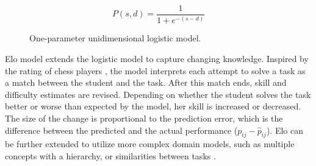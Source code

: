 \begin{figure}[htb]
\centering
\begin{subfigure}{.58\textwidth}
\centering
{}
\end{subfigure}
\begin{subfigure}{.38\textwidth}
\centering
\begin{equation}\label{eq:logistic}
P(s, d) = \frac{1}{1 + e^{-(s - d)}}
\end{equation}
\end{subfigure}
\caption{One-parameter unidimensional logistic model.}
\label{fig:logistic-model}
\end{figure}


Elo model \cite{alg.elo, mathsgarden} extends the logistic model
  to capture changing knowledge.
Inspired by the rating of chess players \cite{elo-rating},
  the model interprets each attempt  to solve a task
  as a match between the student and the task.
After this match ends, skill and difficulty estimates are revised.
Depending on whether the student solves the task better or worse than expected
  by the model, her skill is increased or decreased.
The size of the change is proportional to the prediction error, which is the difference
  between the predicted and the actual performance ($p_{ij} - \hat{p}_{ij}$). %
  Elo can be further extended to utilize more complex domain models,
  such as multiple concepts with a hierarchy,
  or similarities between tasks \cite{rihak-phd}.




